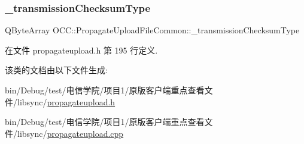 \subsubsection{\texorpdfstring{\+\_\+transmission\+Checksum\+Type}{\_transmissionChecksumType}}
{\footnotesize\ttfamily Q\+Byte\+Array O\+C\+C\+::\+Propagate\+Upload\+File\+Common\+::\+\_\+transmission\+Checksum\+Type\hspace{0.3cm}{\ttfamily [protected]}}



在文件 propagateupload.\+h 第 195 行定义.



该类的文档由以下文件生成\+:\begin{DoxyCompactItemize}
\item 
bin/\+Debug/test/电信学院/项目1/原版客户端重点查看文件/libsync/\hyperlink{propagateupload_8h}{propagateupload.\+h}\item 
bin/\+Debug/test/电信学院/项目1/原版客户端重点查看文件/libsync/\hyperlink{propagateupload_8cpp}{propagateupload.\+cpp}\end{DoxyCompactItemize}
